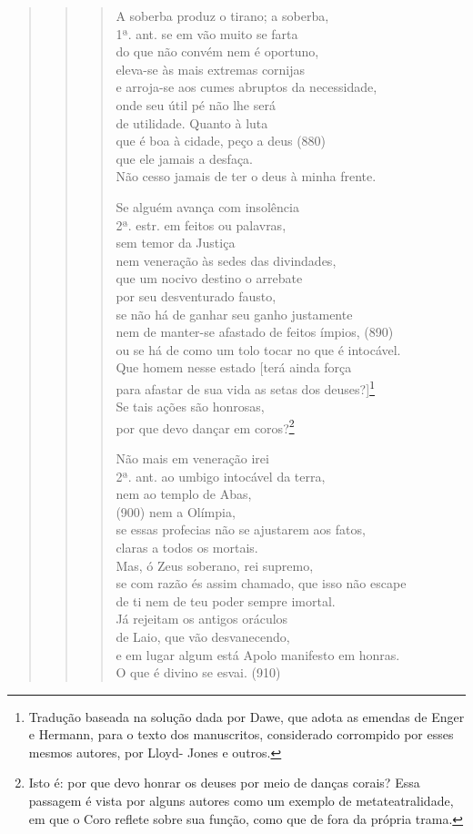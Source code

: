 \begin{verse}
\begin{verse}
\begin{verse}
A soberba produz o tirano; a soberba,\\ 1ª. ant.
se em vão muito se farta\\
do que não convém nem é oportuno,\\
eleva-se às mais extremas cornijas\\
e arroja-se aos cumes abruptos da necessidade,\\
onde seu útil pé não lhe será\\
de utilidade. Quanto à luta\\
que é boa à cidade, peço a deus (880)\\
que ele jamais a desfaça.\\
Não cesso jamais de ter o deus à minha frente.

Se alguém avança com insolência\\ 2ª. estr.
em feitos ou palavras,\\
sem temor da Justiça\\
nem veneração às sedes das divindades,\\
que um nocivo destino o arrebate\\
por seu desventurado fausto,\\
se não há de ganhar seu ganho justamente\\
nem de manter-se afastado de feitos ímpios, (890)\\
ou se há de como um tolo tocar no que é intocável.\\
Que homem nesse estado {[}terá ainda força\\
para afastar de sua vida as setas dos deuses?{]}\footnote{Tradução
baseada na solução dada por Dawe, que adota as emendas de Enger e
Hermann, para o texto dos manuscritos, considerado corrompido por
esses mesmos autores, por Lloyd- Jones e outros.}\\
Se tais ações são honrosas,\\
por que devo dançar em coros?\footnote{Isto é: por que devo honrar os
  deuses por meio de danças corais? Essa passagem é vista por alguns
  autores como um exemplo de metateatralidade, em que o Coro reflete
  sobre sua função, como que de fora da própria trama.}

Não mais em veneração irei\\ 2ª. ant.
ao umbigo intocável da terra,\\
nem ao templo de Abas,\\ (900)
nem a Olímpia,\\
se essas profecias não se ajustarem aos fatos,\\
claras a todos os mortais.\\
Mas, ó Zeus soberano, rei supremo,\\
se com razão és assim chamado, que isso não escape\\
de ti nem de teu poder sempre imortal.\\
Já rejeitam os antigos oráculos\\
de Laio, que vão desvanecendo,\\
e em lugar algum está Apolo manifesto em honras.\\
O que é divino se esvai. (910)
\end{verse}


\end{verse}
\end{verse}
